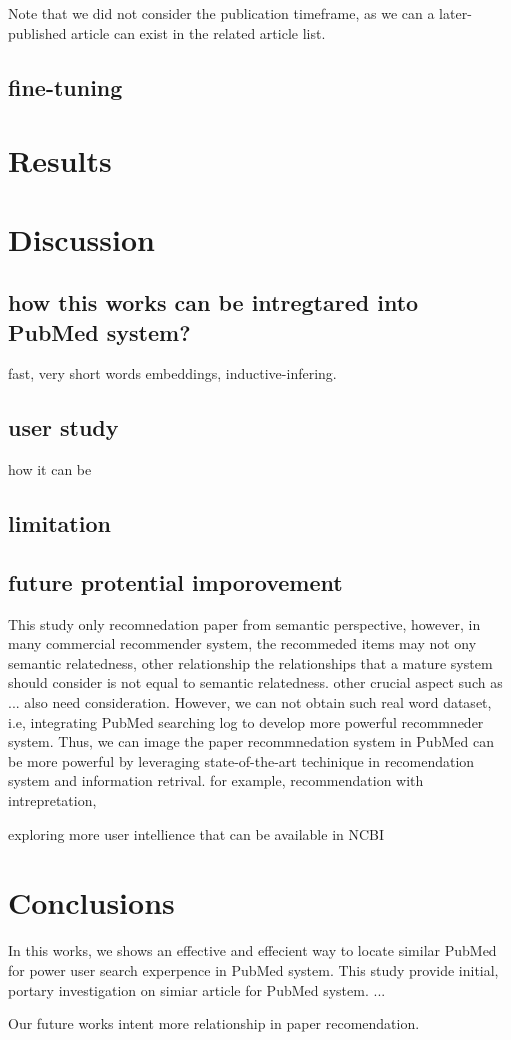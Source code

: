 \documentclass[11pt]{article}
\begin{document}
    Note that we did not consider the publication timeframe, as we can a later-published article can exist in the related article list.

    \subsection{fine-tuning}


    \section{Results}


    \section{Discussion}
    \subsection{how this works can be intregtared into PubMed system?}
    fast, very short words embeddings, inductive-infering.

    \subsection{user study}
    how it can be
    \subsection{limitation}
    \subsection{future protential imporovement}

    This study only recomnedation paper from semantic perspective, however, in many commercial recommender system, the recommeded items may not ony semantic relatedness, other relationship
    the relationships that a mature system should consider is not equal to semantic relatedness. other crucial aspect such as ... also need consideration.
    However, we can not obtain such real word dataset, i.e, integrating PubMed searching log to develop more powerful recommneder system.
    Thus, we can image the paper recommnedation system in PubMed can be more powerful by leveraging state-of-the-art techinique in recomendation system and information retrival.
    for example, recommendation with intrepretation,

    exploring more user intellience that can be available in NCBI

    \section{Conclusions}
    In this works, we shows an effective and effecient way to locate similar PubMed for power user search experpence in PubMed system.
    This study provide initial, portary investigation on simiar article for PubMed system.
    ...

    Our future works intent more relationship in paper recomendation.

    
    
\end{document}
